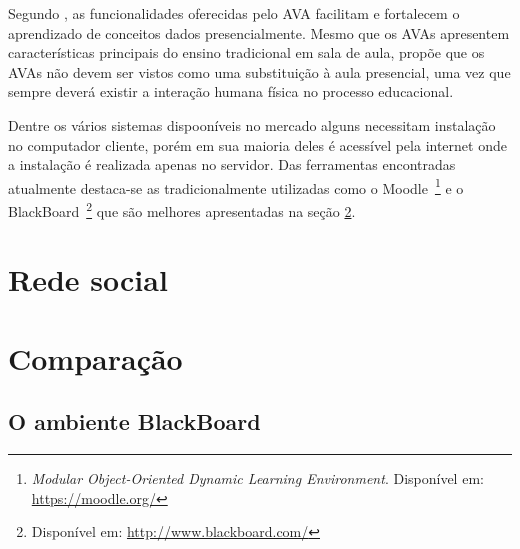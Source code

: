 Segundo , as funcionalidades oferecidas pelo AVA facilitam e fortalecem o aprendizado de conceitos dados presencialmente. Mesmo que os AVAs apresentem características principais do ensino tradicional em sala de aula,  propõe que os AVAs não devem ser vistos como uma substituição à aula presencial, uma vez que sempre deverá existir a interação humana física no processo educacional.

Dentre os vários sistemas dispooníveis no mercado alguns necessitam instalação no computador cliente, porém em sua maioria deles é acessível pela internet onde a instalação é realizada apenas no servidor. Das ferramentas encontradas atualmente destaca-se as tradicionalmente utilizadas como o Moodle~\footnote{\textit{Modular Object-Oriented Dynamic Learning Environment}. Disponível em: \url{https://moodle.org/}} e o BlackBoard~\footnote{Disponível em: \url{http://www.blackboard.com/}} que são melhores apresentadas na seção \ref{comparacao-ava}.
%
%
%
\section{Rede social}
\label{rede-social}

\section{Comparação}
\label{comparacao-ava}
\subsection{O ambiente BlackBoard}
